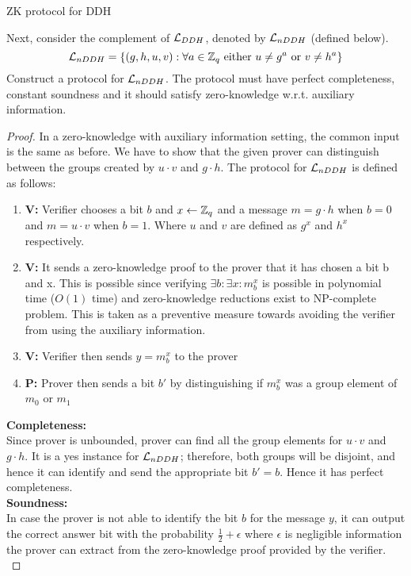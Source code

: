 \begin{solution}{ZK protocol for DDH}\label{ques:23}
    \begin{question}
    Next, consider the complement of $\mathcal{L}_{DDH}$, denoted by $\mathcal{L}_{nDDH}$ (defined below).
    \begin{equation}
        \mathcal{L}_{nDDH} = \{(g,h,u,v): \forall a \in \mathbb{Z}_q \text{ either } u \neq g^a \text{ or } v \neq h^a \}
    \end{equation}
    Construct a protocol for $\mathcal{L}_{nDDH}$. The protocol must have perfect completeness, constant soundness and it should satisfy zero-knowledge w.r.t. auxiliary information.
    \end{question}
    \tcblower{}
    \begin{proof}
    In a zero-knowledge with auxiliary information setting, the common input is the same as before. We have to show that the given prover can distinguish between the groups created by $u\cdot v$ and $g \cdot h$. The protocol for $\mathcal{L}_{nDDH}$ is defined as follows:
    \begin{enumerate}
        \item \textbf{V:} Verifier chooses a bit $b$ and $x\leftarrow \mathbb{Z}_q$ and a message $m=g\cdot h$ when $b = 0$ and $m = u \cdot v$ when $b = 1$. Where $u$ and $v$ are defined as $g^x$ and $h^x$ respectively.
        \item \textbf{V:} It sends a zero-knowledge proof to the prover that it has chosen a bit b and x. This is possible since verifying $\exists b : \exists x : m_b^x$ is possible in polynomial time ($O(1)$ time) and zero-knowledge reductions exist to NP-complete problem. This is taken as a preventive measure towards avoiding the verifier from using the auxiliary information.
        \item \textbf{V:} Verifier then sends $y = m_b^x$ to the prover
        \item \textbf{P:} Prover then sends a bit $b'$ by distinguishing if $m_b^x$ was a group element of $m_0$ or $m_1$
    \end{enumerate}
    \textbf{Completeness:}\\
    Since prover is unbounded, prover can find all the group elements for $u\cdot v$ and $g\cdot h$. It is a yes instance for $\mathcal{L}_{nDDH}$; therefore, both groups will be disjoint, and hence it can identify and send the appropriate bit $b' = b$. Hence it has perfect completeness.\\
    
    \textbf{Soundness:}\\
    In case the prover is not able to identify the bit $b$ for the message $y$, it can output the correct answer bit with the probability $\frac{1}{2}+\epsilon$ where $\epsilon$ is negligible information the prover can extract from the zero-knowledge proof provided by the verifier. \\
    

\end{proof}
\end{solution}
